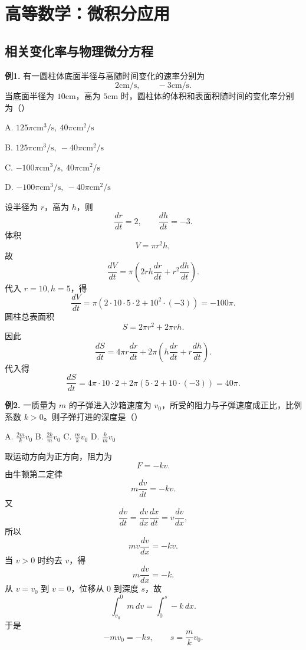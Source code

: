 \chapter{高等数学：微积分应用}

\section{相关变化率与物理微分方程}

\begin{problemblock}
\textbf{例1.} 有一圆柱体底面半径与高随时间变化的速率分别为
\[
2\mathrm{cm}/\mathrm{s},\qquad -3\mathrm{cm}/\mathrm{s}.
\]
当底面半径为 \(10\mathrm{cm}\)，高为 \(5\mathrm{cm}\) 时，圆柱体的体积和表面积随时间的变化率分别为（\quad）

A. \(125\pi\mathrm{cm}^3/\mathrm{s},\ 40\pi\mathrm{cm}^2/\mathrm{s}\)

B. \(125\pi\mathrm{cm}^3/\mathrm{s},\ -40\pi\mathrm{cm}^2/\mathrm{s}\)

C. \(-100\pi\mathrm{cm}^3/\mathrm{s},\ 40\pi\mathrm{cm}^2/\mathrm{s}\)

D. \(-100\pi\mathrm{cm}^3/\mathrm{s},\ -40\pi\mathrm{cm}^2/\mathrm{s}\)
\end{problemblock}
\begin{solutionblock}
设半径为 \(r\)，高为 \(h\)，则
\[
\frac{dr}{dt}=2,\qquad \frac{dh}{dt}=-3.
\]
体积
\[
V=\pi r^2h,
\]
故
\[
\frac{dV}{dt}
=\pi\left(2rh\frac{dr}{dt}+r^2\frac{dh}{dt}\right).
\]
代入 \(r=10,h=5\)，得
\[
\frac{dV}{dt}
=\pi(2\cdot10\cdot5\cdot2+10^2\cdot(-3))
=-100\pi.
\]
圆柱总表面积
\[
S=2\pi r^2+2\pi rh.
\]
因此
\[
\frac{dS}{dt}
=4\pi r\frac{dr}{dt}
+2\pi\left(h\frac{dr}{dt}+r\frac{dh}{dt}\right).
\]
代入得
\[
\frac{dS}{dt}
=4\pi\cdot10\cdot2+2\pi(5\cdot2+10\cdot(-3))
=40\pi.
\]
\end{solutionblock}

\begin{problemblock}
\textbf{例2.} 一质量为 \(m\) 的子弹进入沙箱速度为 \(v_0\)，所受的阻力与子弹速度成正比，比例系数 \(k>0\)。则子弹打进的深度是（\quad）

A. \(\displaystyle \frac{2m}{k}v_0\)
\quad B. \(\displaystyle \frac{2k}{m}v_0\)
\quad C. \(\displaystyle \frac{m}{k}v_0\)
\quad D. \(\displaystyle \frac{k}{m}v_0\)
\end{problemblock}
\begin{solutionblock}
取运动方向为正方向，阻力为
\[
F=-kv.
\]
由牛顿第二定律
\[
m\frac{dv}{dt}=-kv.
\]
又
\[
\frac{dv}{dt}=\frac{dv}{dx}\frac{dx}{dt}=v\frac{dv}{dx},
\]
所以
\[
mv\frac{dv}{dx}=-kv.
\]
当 \(v>0\) 时约去 \(v\)，得
\[
m\frac{dv}{dx}=-k.
\]
从 \(v=v_0\) 到 \(v=0\)，位移从 \(0\) 到深度 \(s\)，故
\[
\int_{v_0}^{0}m\,dv=\int_0^s -k\,dx.
\]
于是
\[
-mv_0=-ks,
\qquad
s=\frac{m}{k}v_0.
\]
\end{solutionblock}

